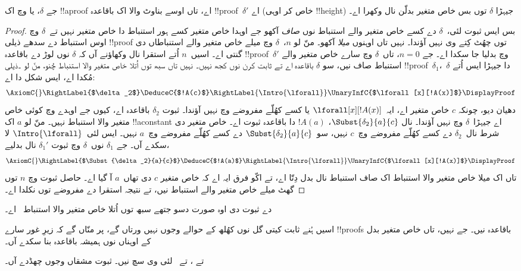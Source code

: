 \documentclass[../../../include/open-logic-section]{subfiles}
\begin{document}
\begin{prop}
جے $\delta$،  یا  وچ اک !!a{proof} اے، تاں اوسے بناوٹ والا اک باقاعدہ !!{proof}~$\delta'$ اے (خاص کر اوہی !!{height}) جیہڑا $\delta$ توں بس خاص متغیر بدلّن نال وکھرا اے۔
\end{prop}

\begin{proof}
بس ایس ثبوت لئی،~$\delta$ دے کسے خاص متغیر والے استنباط نوں \emph{صاف} آکھو جے اوہدا خاص متغیر کسے ہور استنباط دا خاص متغیر نہیں تے~$\delta$ وچ اوس استنباط دے سدھے ذیلی !!{proof} توں چھُٹ کِتے وی نہیں آؤندا۔ نہیں تاں اوہنوں \emph{میلا} آکھو۔ منّ لو $n$،~$\delta$ وچ میلے خاص متغیر والے استنباطاں دی گنتی اے۔ اسیں~$n$ اُتے استقرا نال وکھاؤنے آں کہ $\delta$ نوں لوڑ دے باقاعدہ !!{proof}~$\delta'$ وچ بدلیا جا سکدا اے۔ جے $n=0$، تاں~$\delta$ وچ سارے خاص متغیر والے استنباط صاف نیں، سو $\delta$ باقاعدہ اے تے ثابت کرن نوں کجھ نہیں۔ نہیں تاں سبھ توں اُتلا خاص متغیر والا استنباط چُنو، منّ لو \Intro{\lforall}۔ذیلی !!{proof}~$\delta_1$،~$\delta$ دا جیہڑا ایس اُتے مُکدا اے، ایس شکل دا اے:
\[
    \AxiomC{}
    \RightLabel{$\delta_2$}
    \DeduceC{$!A(c)$}
    \RightLabel{\Intro{\lforall}}
    \UnaryInfC{$\lforall[x][!A(x)]$}
    \DisplayProof
    \]
دھیان دیو، چونکہ $c$ خاص متغیر اے، ایہ~$\lforall[x][!A(x)]$ یا کسے کھُلّے مفروضے وچ نہیں آؤندا۔ ثبوت $\delta_2$ باقاعدہ اے، کیوں جے اوہدے وچ کوئی خاص متغیر والا استنباط نہیں۔ منّ لو $a$ اک !!a{constant} اے جیہڑا~$\delta$ وچ نہیں آؤندا۔  نال $\Subst{\delta_2}{a}{c}$، $!A(a)$ دا باقاعدہ ثبوت اے۔ خاص متغیر دی شرط نال~$\delta_2$ دے کسے کھُلّے مفروضے وچ~$c$ نہیں، سو~$\Subst{\delta_2}{a}{c}$ دے کسے کھُلّے مفروضے وچ~$a$ نہیں۔ ایس لئی~$\Intro{\lforall}$ لا سکدے آں۔ جے $\delta_1$ نوں~$\delta$ وچ ثبوت $\delta_1'$ نال بدلیے،
\[
    \AxiomC{}
    \RightLabel{$\Subst{\delta_2}{a}{c}$}
    \DeduceC{$!A(a)$}
    \RightLabel{\Intro{\lforall}}
    \UnaryInfC{$\lforall[x][!A(x)]$}
    \DisplayProof
    \]
تاں اک میلا خاص متغیر والا استنباط اک صاف استنباط نال بدل دِتّا اے، تے اکّو فرق ایہ اے کہ خاص متغیر $c$ دی تھاں~$a$ آ گیا اے۔ حاصل ثبوت وچ $n$ توں گھٹ میلے خاص متغیر والے استنباط نیں، تے نتیجہ استقرا دے مفروضے توں نکلدا اے۔
\end{proof}

\begin{prob}
 دے ثبوت دی اوہ صورت دسو جتھے سبھ توں اُتلا خاص متغیر والا استنباط~\Elim{\lexists} اے۔
\end{prob}

اسیں ہُنے ثابت کیتی گل نوں کھُلھ کے حوالے وجوں نہیں ورتاں گے، پر منّاں گے کہ زیرِ غور سارے !!{proof}s باقاعدہ نیں۔ جے نہیں، تاں خاص متغیر بدل کے اوہناں نوں ہمیشہ باقاعدہ بنا سکدے آں۔

 تے ،  تے~ لئی وی سچ نیں۔ ثبوت مشقاں وجوں چھڈدے آں۔
\end{document}
